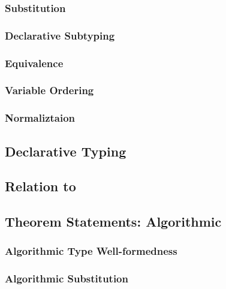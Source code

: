 \subsubsection{Substitution}


\subsubsection{Declarative Subtyping}


\subsubsection{Equivalence}
\label{sec:decl-equiv-statements}


\subsubsection{Variable Ordering}


\subsubsection{Normaliztaion}


\subsection{Declarative Typing}


\subsection{Relation to \systemf}


\subsection{Theorem Statements: Algorithmic}

\subsubsection{Algorithmic Type Well-formedness}


\subsubsection{Algorithmic Substitution}


